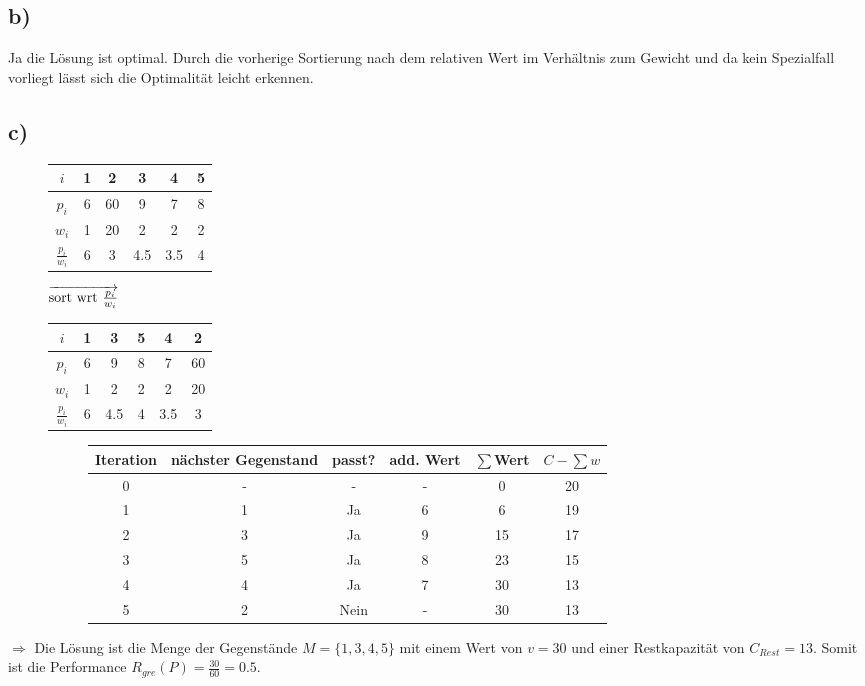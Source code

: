 \documentclass[12pt]{article}
\begin{document}
	\subsection{b)} 
	Ja die Lösung ist optimal. Durch die vorherige Sortierung nach dem relativen Wert im Verhältnis zum Gewicht und da kein Spezialfall vorliegt lässt sich die Optimalität leicht erkennen.
	
	\subsection{c)}
	\begin{figure}[H]
		\centering
		\begin{tabular}{c | c c c c c}
			$i$ & 1 & 2 & 3 & 4 & 5 \\ \hline
			$p_i$ & 6 & 60 & 9 & 7 & 8 \\
			$w_i$ & 1 & 20 & 2 & 2 & 2 \\
			$\frac{p_i}{w_i}$ & 6 & 3 & 4.5 & 3.5 & 4 \\
		\end{tabular}
		$\overrightarrow{$sort wrt $\frac{p_i}{w_i}}$
		\begin{tabular}{c | c c c c c}
			$i$ 				& 1 & 3   & 5 & 4  & 2  \\ \hline
			$p_i$ 				& 6 & 9   & 8 & 7  & 60 \\
			$w_i$ 				& 1 & 2   & 2 & 2  & 20 \\
			$\frac{p_i}{w_i}$ 	& 6 & 4.5 & 4 & 3.5& 3  \\
		\end{tabular}
	
		\begin{figure}[H]
			\centering
			\begin{tabular}{c | c c c c c}
				Iteration & nächster Gegenstand & passt? & add. Wert & $\sum$Wert & $C-\sum w$ \\ \hline
				0 & - & - & - & 0 & 20 \\
				1 & 1 & Ja & 6 & 6 & 19 \\
				2 & 3 & Ja & 9 & 15 & 17 \\
				3 & 5 & Ja & 8 & 23 & 15 \\
				4 & 4 & Ja & 7 & 30 & 13 \\
				5 & 2 & Nein & - & 30 & 13 \\
			\end{tabular}			
		\end{figure}
	\end{figure}
	$\Rightarrow$ Die Lösung ist die Menge der Gegenstände $M=\{1 ,3 ,4, 5\}$ mit einem Wert von $v=30$ und einer Restkapazität von $C_{Rest}=13$. Somit ist die Performance $R_{gre}(P)=\frac{30}{60}=0.5$.
\end{document}
